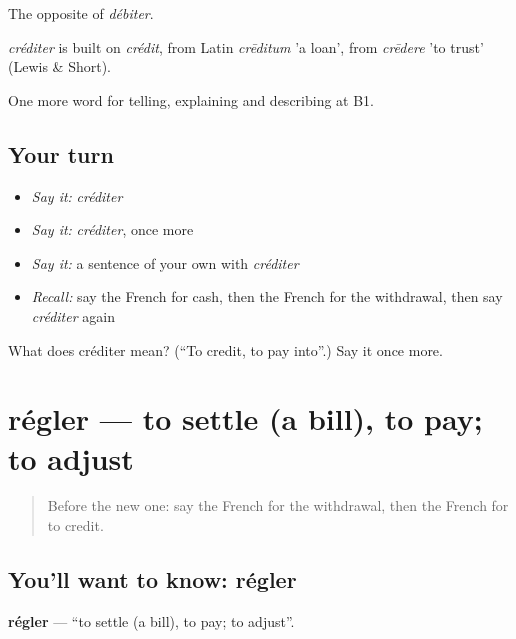 The opposite of \emph{débiter}.

\begin{cousinweb}
\emph{créditer} is built on \emph{crédit}, from Latin \emph{crēditum} 'a loan', from \emph{crēdere} 'to trust' (Lewis \& Short).
\end{cousinweb}

\begin{grammarlens}[title={What you've built}]
One more word for telling, explaining and describing at B1.
\end{grammarlens}

\subsection*{Your turn}
\begin{itemize}
\raggedright
  \item \emph{Say it:} \emph{créditer}
  \item \emph{Say it:} \emph{créditer}, once more
  \item \emph{Say it:} a sentence of your own with \emph{créditer}
  \item \emph{Recall:} say the French for cash, then the French for the withdrawal, then say \emph{créditer} again
\end{itemize}

\begin{tcolorbox}[breakable,colback=teal!4,colframe=teal!35!black,title={Before you move on}]
What does créditer mean? (\textquotedblleft{}To credit, to pay into\textquotedblright{}.) Say it once more.
\end{tcolorbox}
\section[régler]{régler — to settle (a bill), to pay; to adjust}

\label{lesson:FR-C451-regler}



\begin{quote}
Before the new one: say the French for the withdrawal, then the French for to credit.
\end{quote}

\subsection*{You'll want to know: régler}
\textbf{régler} — \textquotedblleft{}to settle (a bill), to pay; to adjust\textquotedblright{}.

